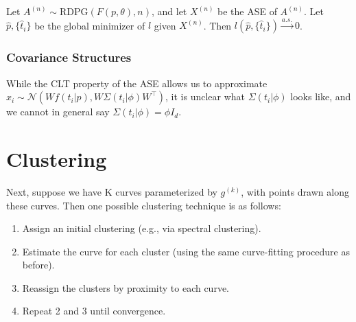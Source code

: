 \documentclass[
  11pt,
]{article}
\providecommand{\tightlist}{%
  \setlength{\itemsep}{0pt}\setlength{\parskip}{0pt}}
\begin{document}
\begin{theorem}

Let $A^{(n)} \sim \mathrm{RDPG}(F(p, \theta), n)$, and let $X^{(n)}$ be the ASE of $A^{(n)}$. 
Let $\hat{p}, \{\hat{t}_i\}$ be the global minimizer of $l$ given $X^{(n)}$. 
Then $l(\hat{p}, \{\hat{t}_i\}) \stackrel{a.s.}{\to} 0$. 

\end{theorem}

\hypertarget{covariance-structures}{%
\subsubsection{Covariance Structures}\label{covariance-structures}}

While the CLT property of the ASE allows us to approximate
\(x_i \sim \mathcal{N} (W f(t_i | p), W \Sigma(t_i | \phi) W^\top)\), it
is unclear what \(\Sigma(t_i | \phi)\) looks like, and we cannot in
general say \(\Sigma(t_i | \phi) = \phi I_d\).

\hypertarget{clustering}{%
\section{Clustering}\label{clustering}}

Next, suppose we have K curves parameterized by \(g^{(k)}\), with points
drawn along these curves. Then one possible clustering technique is as
follows:

\begin{enumerate}
\def\labelenumi{\arabic{enumi}.}
\tightlist
\item
  Assign an initial clustering (e.g., via spectral clustering).
\item
  Estimate the curve for each cluster (using the same curve-fitting
  procedure as before).
\item
  Reassign the clusters by proximity to each curve.
\item
  Repeat 2 and 3 until convergence.
\end{enumerate}
\end{document}
